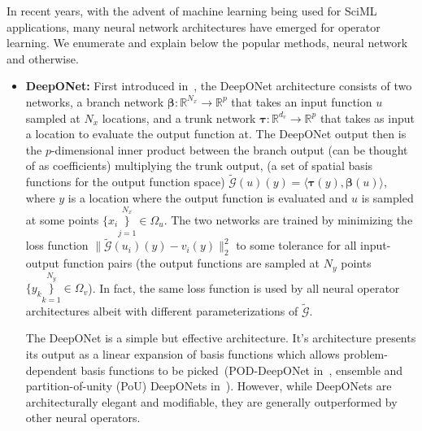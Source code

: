 \documentclass[12pt]{exam}
\def\R{\mathbb{R}}
\def\G{\mathcal{G}}
\begin{document}
\begin{questions}
In recent years, with the advent of machine learning being used for SciML applications, many neural network architectures have emerged for operator learning. We enumerate and explain below the popular methods, neural network and otherwise.
\begin{itemize}
\item {\bf DeepONet:} First introduced in~\citep{lu2019deeponet}, the DeepONet architecture consists of two networks, a branch network $\boldsymbol{\beta}: \R^{N_x} \rightarrow \R^p$ that takes an input function $u$ sampled at $N_x$ locations, and a trunk network $\boldsymbol{\tau}: \R^{d_v} \rightarrow \R^p$ that takes as input a location to evaluate the output function at. The DeepONet output then is the $p$-dimensional inner product between the branch output (can be thought of as coefficients) multiplying the trunk output, (a set of spatial basis functions for the output function space) $\tilde{\G}(u)(y) = \langle \boldsymbol{\tau}(y), \boldsymbol{\beta}(u) \rangle$, where $y$ is a location where the output function is evaluated and $u$ is sampled at some points $\{x_i\}\limits_{j=1}^{N_x} \in \Omega_u$. The two networks are trained by minimizing the loss function $\|\tilde{\G}(u_i)(y) - v_i(y) \|_2^2$ to some tolerance for all input-output function pairs (the output functions are sampled at $N_y$ points $\{y_k\}\limits_{k=1}^{N_y} \in \Omega_v$). In fact, the same loss function is used by all neural operator architectures albeit with different parameterizations of $\tilde{\G}$.

The DeepONet is a simple but effective architecture. It's architecture presents its output as a linear expansion of basis functions which allows problem-dependent basis functions to be picked~(POD-DeepONet in~\citep{lu2022comprehensive}, ensemble and partition-of-unity (PoU) DeepONets in~\citep{sharma2024ensemble}). However, while DeepONets are architecturally elegant and modifiable, they are generally outperformed by other neural operators.


\end{itemize}
\end{questions}
\end{document}
